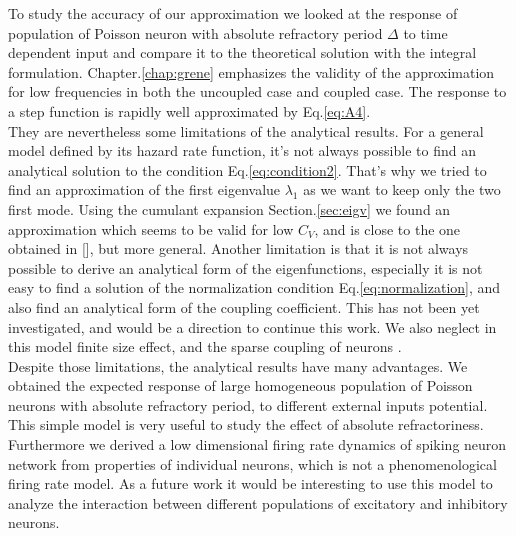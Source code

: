 \documentclass[12pt,twoside]{report}
\begin{document}
To study the accuracy of our approximation we looked at the response of population of Poisson neuron with absolute refractory period $\Delta$ to time dependent input and compare it to the theoretical solution with the integral formulation. Chapter.\ref{chap:grene} emphasizes the validity of the approximation for low frequencies in both the uncoupled case and coupled case. The response to a step function is rapidly well approximated by Eq.\eqref{eq:A4}.\\

They are nevertheless some limitations of the analytical results. For a general model defined by its hazard rate function, it's not always possible to find an analytical solution to the condition Eq.\eqref{eq:condition2}. That's why we tried to find an approximation of the first eigenvalue $\lambda_1$  as we want to keep only the two first mode. Using the cumulant expansion Section.\eqref{sec:eigv} we found an approximation which seems to be valid for low $C_V$, and is close to the one obtained in [\cite{SchOst13}], but more general. Another limitation is that it is not always possible to derive an analytical form of the eigenfunctions, especially  it is not easy to find a solution of the normalization condition Eq.\eqref{eq:normalization}, and also find an analytical form of the coupling coefficient. This has not been yet investigated, and would be a direction to continue this work. We also neglect in this model finite size effect, and the sparse coupling of neurons \cite{SchDeg17}. \\

Despite those limitations, the analytical results have many advantages. We obtained the expected response of large homogeneous population of Poisson neurons with absolute refractory period, to different external inputs potential. This simple model is very useful to study the effect of absolute refractoriness. Furthermore we derived a low dimensional firing rate dynamics of spiking neuron network from properties of individual neurons, which is not a phenomenological firing rate model. As a future work it would be interesting to use this model to analyze the interaction between different populations of excitatory and inhibitory neurons.



%

\clearpage
\end{document}
